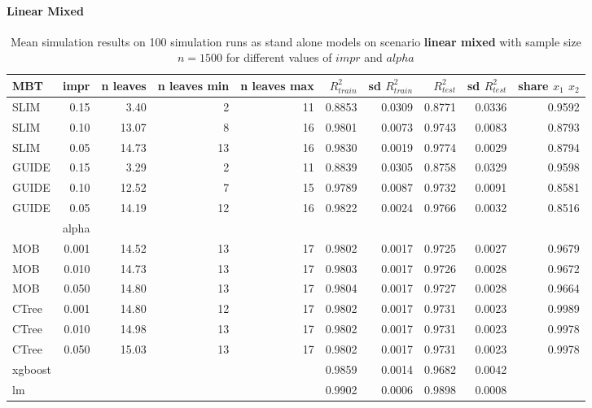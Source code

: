 \paragraph{Linear Mixed}
\begin{table}[!htb]
\centering \tiny
\begin{tabular}[t]{l|r|r|r|r|r|r|r|r|r}
\hline

MBT & impr  & n leaves & n leaves min & n leaves max & $R^2_{train}$ & sd $R^2_{train}$ & $R^2_{test}$ & sd $R^2_{test}$ & share $x_1$ $x_2$\\
\hline

SLIM & 0.15 & 3.40 & 2 & 11 & 0.8853 & 0.0309 & 0.8771 & 0.0336 & 0.9592\\
SLIM & 0.10 & 13.07 & 8 & 16 & 0.9801 & 0.0073 & 0.9743 & 0.0083 & 0.8793\\
SLIM & 0.05 & 14.73 & 13 & 16 & 0.9830 & 0.0019 & 0.9774 & 0.0029 & 0.8794\\
GUIDE & 0.15 & 3.29 & 2 & 11 & 0.8839 & 0.0305 & 0.8758 & 0.0329 & 0.9598\\
GUIDE & 0.10 & 12.52 & 7 & 15 & 0.9789 & 0.0087 & 0.9732 & 0.0091 & 0.8581\\
GUIDE & 0.05 & 14.19 & 12 & 16 & 0.9822 & 0.0024 & 0.9766 & 0.0032 & 0.8516\\

\hline

& alpha & & & & & & & \\
\hline

MOB & 0.001 & 14.52 & 13 & 17 & 0.9802 & 0.0017 & 0.9725 & 0.0027 & 0.9679\\
MOB & 0.010 & 14.73 & 13 & 17 & 0.9803 & 0.0017 & 0.9726 & 0.0028 & 0.9672\\
MOB & 0.050 & 14.80 & 13 & 17 & 0.9804 & 0.0017 & 0.9727 & 0.0028 & 0.9664\\

CTree & 0.001 & 14.80 & 12 & 17 & 0.9802 & 0.0017 & 0.9731 & 0.0023 & 0.9989\\
CTree & 0.010 & 14.98 & 13 & 17 & 0.9802 & 0.0017 & 0.9731 & 0.0023 & 0.9978\\
CTree & 0.050 & 15.03 & 13 & 17 & 0.9802 & 0.0017 & 0.9731 & 0.0023 & 0.9978\\
\hline

xgboost & & & & & 0.9859 & 0.0014 & 0.9682 & 0.0042 &\\
lm & & & & & 0.9902 & 0.0006 & 0.9898 & 0.0008 &\\
\hline

\end{tabular}
\caption{Mean simulation results on 100 simulation runs as stand alone models on scenario \textbf{linear mixed} with sample size $n = 1500$ for different values of $impr$ and $alpha$}
\label{tab:linear_mixed_summary}
\end{table}

